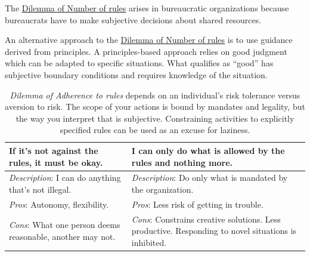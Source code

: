 The \hyperref[table:dilemma-personal-number-of-rules]{Dilemma of Number of rules}
arises in bureaucratic organizations because bureaucrats have to make subjective decisions about shared resources. 


An alternative approach to the  \hyperref[table:dilemma-personal-number-of-rules]{Dilemma of Number of rules}
is to use guidance derived from principles. A principles-based approach relies on good judgment which can be adapted to specific situations. What qualifies as ``good'' has subjective boundary conditions and requires knowledge of the situation.



\begin{center}
\begin{table}[H] %
\begin{tabular}{ | m{\dilemmatablewidth}| m{\dilemmatablewidth} | } 
  \hline
  \textbf{If it's not against the rules, it must be okay.} & 
  \textbf{I can only do what is allowed by the rules and nothing more.} \\ 
  \hline
  \textit{Description}: I can do anything that's not illegal. &
  \textit{Description}: Do only what is mandated by the organization. \\
  \hline
  \textit{Pros}: Autonomy, flexibility. &
  \textit{Pros}: Less risk of getting in trouble. \\
  \hline
  \textit{Cons}: What one person deems reasonable, another may not. & 
  \textit{Cons}: Constrains creative solutions. Less productive. Responding to novel situations is inhibited. \\  
  \hline
\end{tabular}
\caption{
\textit{Dilemma of Adherence to rules} depends on an individual's risk tolerance versus aversion to risk. 
The scope of your actions is bound by mandates and legality, but the way you interpret that is subjective. 
Constraining activities to explicitly specified rules can be used as an excuse for laziness. 
}
\label{table:dilemma-personal-rule-adherence}
\end{table}
\end{center}

